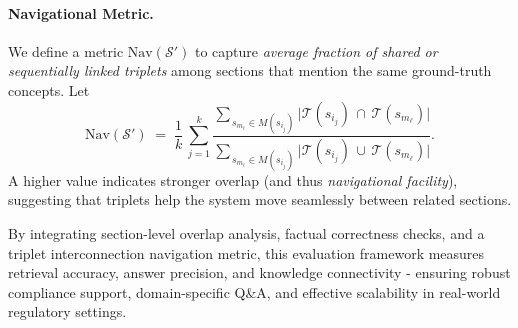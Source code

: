 \documentclass{article}
\begin{document}
\paragraph{Navigational Metric.}
We define a metric \(\mathrm{Nav}(\mathcal{S}')\) to capture \emph{average fraction of shared or sequentially linked triplets} among sections that mention the same ground-truth concepts. Let
\[
\mathrm{Nav}(\mathcal{S}')
\;=\;
\frac{1}{k}\,\sum_{j=1}^k
\frac{\sum_{\,s_{m_\ell}\in M(s_{i_j})}
\bigl|
\mathcal{T}(s_{i_j}) \,\cap\, \mathcal{T}(s_{m_\ell})
\bigr|}
{\sum_{\,s_{m_\ell}\in M(s_{i_j})}
\bigl|
\mathcal{T}(s_{i_j}) \,\cup\, \mathcal{T}(s_{m_\ell})
\bigr|}.
\]
A higher value indicates stronger overlap (and thus \emph{navigational facility}), suggesting that triplets help the system move seamlessly between related sections.

By integrating section-level overlap analysis, factual correctness checks, and a triplet interconnection navigation metric, this evaluation framework measures retrieval accuracy, answer precision, and knowledge connectivity - ensuring robust compliance support, domain-specific Q\&A, and effective scalability in real-world regulatory settings.
\end{document}
